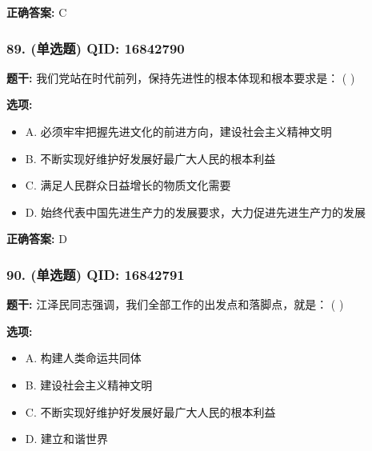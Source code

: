 \documentclass[12pt,UTF8]{ctexart}
\begin{document}
\textbf{正确答案:}
C

\vspace{0.3em}\hrulefill\vspace{0.7em}

\subsubsection*{89. (单选题) \small QID: 16842790}

\textbf{题干:}
我们党站在时代前列，保持先进性的根本体现和根本要求是： ( )

\textbf{选项:}
\begin{itemize}[leftmargin=*]

  \item A. 必须牢牢把握先进文化的前进方向，建设社会主义精神文明

  \item B. 不断实现好维护好发展好最广大人民的根本利益

  \item C. 满足人民群众日益增长的物质文化需要

  \item D. 始终代表中国先进生产力的发展要求，大力促进先进生产力的发展

\end{itemize}

\textbf{正确答案:}
D

\vspace{0.3em}\hrulefill\vspace{0.7em}

\subsubsection*{90. (单选题) \small QID: 16842791}

\textbf{题干:}
江泽民同志强调，我们全部工作的出发点和落脚点，就是： ( )

\textbf{选项:}
\begin{itemize}[leftmargin=*]

  \item A. 构建人类命运共同体

  \item B. 建设社会主义精神文明

  \item C. 不断实现好维护好发展好最广大人民的根本利益

  \item D. 建立和谐世界

\end{itemize}
\end{document}
